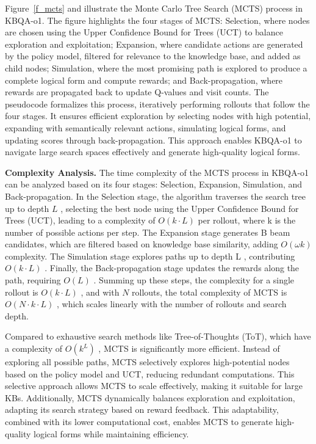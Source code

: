 \documentclass{article}
\theoremstyle{plain}
\theoremstyle{definition}
\theoremstyle{remark}
\begin{document}
Figure~\ref{f_mcts} and  illustrate the Monte Carlo Tree Search (MCTS) process in KBQA-o1. The figure highlights the four stages of MCTS: Selection, where nodes are chosen using the Upper Confidence Bound for Trees (UCT) to balance exploration and exploitation; Expansion, where candidate actions are generated by the policy model, filtered for relevance to the knowledge base, and added as child nodes; Simulation, where the most promising path is explored to produce a complete logical form and compute rewards; and Back-propagation, where rewards are propagated back to update Q-values and visit counts. The pseudocode formalizes this process, iteratively performing rollouts that follow the four stages. It ensures efficient exploration by selecting nodes with high potential, expanding with semantically relevant actions, simulating logical forms, and updating scores through back-propagation. This approach enables KBQA-o1 to navigate large search spaces effectively and generate high-quality logical forms.

\textbf{Complexity Analysis. }
The time complexity of the MCTS process in KBQA-o1 can be analyzed based on its four stages: Selection, Expansion, Simulation, and Back-propagation. In the Selection stage, the algorithm traverses the search tree up to depth  $L$ , selecting the best node using the Upper Confidence Bound for Trees (UCT), leading to a complexity of  $O(k \cdot L)$  per rollout, where  k  is the number of possible actions per step. The Expansion stage generates  B  beam candidates, which are filtered based on knowledge base similarity, adding  $O(\omega k)$  complexity. The Simulation stage explores paths up to depth  L , contributing  $O(k \cdot L)$ . Finally, the Back-propagation stage updates the rewards along the path, requiring  $O(L)$ . Summing up these steps, the complexity for a single rollout is  $O(k \cdot L)$ , and with  $N$  rollouts, the total complexity of MCTS is  $O(N \cdot k \cdot L)$ , which scales linearly with the number of rollouts and search depth.

Compared to exhaustive search methods like Tree-of-Thoughts (ToT), which have a complexity of  $O(k^L)$ , MCTS is significantly more efficient. Instead of exploring all possible paths, MCTS selectively explores high-potential nodes based on the policy model and UCT, reducing redundant computations. This selective approach allows MCTS to scale effectively, making it suitable for large KBs. Additionally, MCTS dynamically balances exploration and exploitation, adapting its search strategy based on reward feedback. This adaptability, combined with its lower computational cost, enables MCTS to generate high-quality logical forms while maintaining efficiency.
\end{document}
